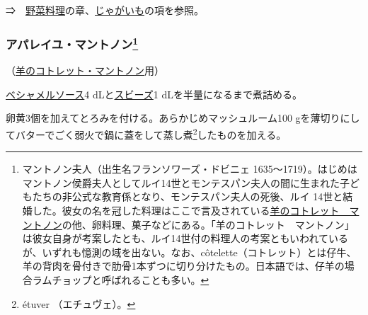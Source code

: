\begin{recette}
⇒　\protect\hyperlink{legumes}{野菜料理}の章、\protect\hyperlink{pommes-de-terre}{じゃがいも}の項を参照。

\atoaki{}

\hypertarget{appareil-maintenon}{%
\subsubsection[アパレイユ・マントノン]{\texorpdfstring{アパレイユ・マントノン\footnote{マントノン夫人（出生名フランソワーズ・ドビニェ
  1635〜1719）。はじめはマントノン侯爵夫人としてルイ14世とモンテスパン夫人の間に生まれた子どもたちの非公式な教育係となり、モンテスパン夫人の死後、ルイ
  14世と結婚した。彼女の名を冠した料理はここで言及されている\protect\hyperlink{cotelettes-maintenon}{羊のコトレット　マントノン}の他、卵料理、菓子などにある。「羊のコトレット　マントノン」は彼女自身が考案したとも、ルイ14世付の料理人の考案ともいわれているが、いずれも憶測の域を出ない。なお、côtelette（コトレット）とは仔牛、羊の背肉を骨付きで肋骨1本ずつに切り分けたもの。日本語では、仔羊の場合ラムチョップと呼ばれることも多い。}}{アパレイユ・マントノン}}\label{appareil-maintenon}}



（\protect\hyperlink{cotelettes-maintenon}{羊のコトレット・マントノン}用）

\protect\hyperlink{sauce-bechamel}{ベシャメルソース}4
dLと\protect\hyperlink{sauce-soubise}{スビーズ}1
dLを半量になるまで煮詰める。

卵黄3個を加えてとろみを付ける。あらかじめマッシュルーム100
gを薄切りにしてバターでごく弱火で鍋に蓋をして蒸し煮\footnote{étuver
  （エチュヴェ）。}したものを加える。

\atoaki{}

\hypertarget{appareil-montglas}{%
}
\end{recette}
